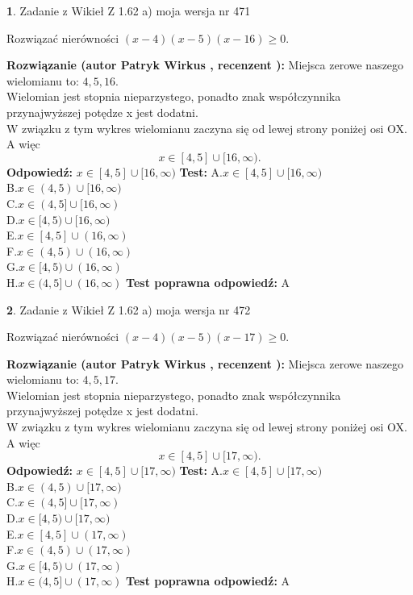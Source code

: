 \documentclass[12pt, a4paper]{article}
\theoremstyle{definition} %
\newtheorem{zad}{}
\newcommand{\zadStart}[1]{\begin{zad}#1\newline}
\newcommand{\zadStop}{\end{zad}}
\newcommand{\rozwStart}[2]{\noindent \textbf{Rozwiązanie (autor #1 , recenzent #2): }\newline}
\newcommand{\rozwStop}{\newline}
\newcommand{\odpStart}{\noindent \textbf{Odpowiedź:}\newline}
\newcommand{\odpStop}{\newline}
\newcommand{\testStart}{\noindent \textbf{Test:}\newline}
\newcommand{\testStop}{\newline}
\newcommand{\kluczStart}{\noindent \textbf{Test poprawna odpowiedź:}\newline}
\newcommand{\kluczStop}{\newline}
\begin{document}
\zadStart{Zadanie z Wikieł Z 1.62 a) moja wersja nr 471}

Rozwiązać nierówności $(x-4)(x-5)(x-16)\ge0$.
\zadStop
\rozwStart{Patryk Wirkus}{}
Miejsca zerowe naszego wielomianu to: $4, 5, 16$.\\
Wielomian jest stopnia nieparzystego, ponadto znak współczynnika przy\linebreak najwyższej potędze x jest dodatni.\\ W związku z tym wykres wielomianu zaczyna się od lewej strony poniżej osi OX. A więc $$x \in [4,5] \cup [16,\infty).$$
\rozwStop
\odpStart
$x \in [4,5] \cup [16,\infty)$
\odpStop
\testStart
A.$x \in [4,5] \cup [16,\infty)$\\
B.$x \in (4,5) \cup [16,\infty)$\\
C.$x \in (4,5] \cup [16,\infty)$\\
D.$x \in [4,5) \cup [16,\infty)$\\
E.$x \in [4,5] \cup (16,\infty)$\\
F.$x \in (4,5) \cup (16,\infty)$\\
G.$x \in [4,5) \cup (16,\infty)$\\
H.$x \in (4,5] \cup (16,\infty)$
\testStop
\kluczStart
A
\kluczStop



\zadStart{Zadanie z Wikieł Z 1.62 a) moja wersja nr 472}

Rozwiązać nierówności $(x-4)(x-5)(x-17)\ge0$.
\zadStop
\rozwStart{Patryk Wirkus}{}
Miejsca zerowe naszego wielomianu to: $4, 5, 17$.\\
Wielomian jest stopnia nieparzystego, ponadto znak współczynnika przy\linebreak najwyższej potędze x jest dodatni.\\ W związku z tym wykres wielomianu zaczyna się od lewej strony poniżej osi OX. A więc $$x \in [4,5] \cup [17,\infty).$$
\rozwStop
\odpStart
$x \in [4,5] \cup [17,\infty)$
\odpStop
\testStart
A.$x \in [4,5] \cup [17,\infty)$\\
B.$x \in (4,5) \cup [17,\infty)$\\
C.$x \in (4,5] \cup [17,\infty)$\\
D.$x \in [4,5) \cup [17,\infty)$\\
E.$x \in [4,5] \cup (17,\infty)$\\
F.$x \in (4,5) \cup (17,\infty)$\\
G.$x \in [4,5) \cup (17,\infty)$\\
H.$x \in (4,5] \cup (17,\infty)$
\testStop
\kluczStart
A
\kluczStop
\end{document}
